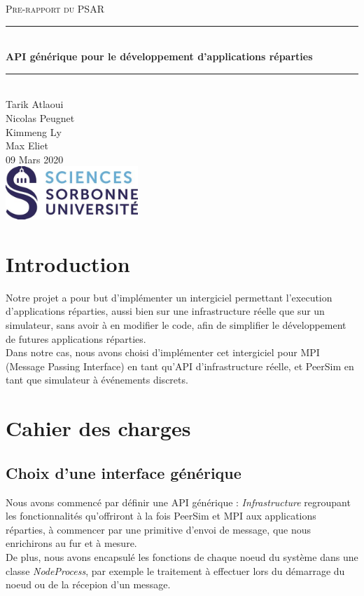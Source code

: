 \documentclass{article}
\date{\today}
\author{Tarik Atlaoui \\ Nicolas Peugnet \\ Kimmeng Ly \\ Max Eliet}
\begin{document}
\begin{titlepage}
	\enlargethispage{2cm}
	\newcommand{\HRule}{\rule{\linewidth}{0.5mm}}
	\center
	\textsc{\LARGE
	Pre-rapport du PSAR 
	} \\[1cm]
	\HRule \\[0.4cm]
	{ \huge \bfseries API générique pour le développement d'applications réparties \\[0.15cm] }
	\HRule \\[4cm]
	\large{Tarik Atlaoui \\[3mm] Nicolas Peugnet \\[3mm] Kimmeng Ly \\[3mm] Max Eliet} \\[3cm]
	09 Mars 2020 \\[3cm]
	\hfill \includegraphics[width=5cm]{logoSU.jpg}
\end{titlepage}

	\newpage
		\section{Introduction}
			\large{
			\indent Notre projet a pour but d'implémenter un intergiciel permettant l'execution d'applications réparties, aussi bien sur une infrastructure réelle que sur un simulateur, sans avoir à en modifier le code, afin de simplifier le développement de futures applications réparties.
\\[2mm]
			 \indent Dans notre cas, nous avons choisi d'implémenter cet intergiciel pour MPI (Message Passing Interface) en tant qu'API d'infrastructure réelle, et PeerSim en tant que simulateur à événements discrets.}

		\section{Cahier des charges}
			\subsection{Choix d'une interface générique}
				\large{ \indent Nous avons commencé par définir une API générique : \textit{Infrastructure} regroupant les fonctionnalités qu'offriront à la fois PeerSim et MPI aux applications réparties, à commencer par une primitive d'envoi de message, que nous enrichirons au fur et à mesure.\\[2mm]
					\indent De plus, nous avons encapsulé les fonctions de chaque noeud du système dans une classe \textit{NodeProcess}, par exemple le traitement à effectuer lors du démarrage du noeud ou de la récepion d'un message.  }
\end{document}

